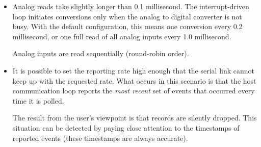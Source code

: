 \begin{itemize}
\item Analog reads take slightly longer than 0.1 millisecond. The 
interrupt-driven loop initiates conversions only when the analog to 
digital converter is not busy. With the default configuration, this means 
one conversion every 0.2 millisecond, or one full read of all analog 
inputs every 1.0 millisecond.

Analog inputs are read sequentially (round-robin order).

\item It is possible to set the reporting rate high enough that the serial 
link cannot keep up with the requested rate. What occurs in this scenario 
is that the host communication loop reports the \textit{most recent} set 
of events that occurred every time it is polled.

The result from the user's viewpoint is that records are silently dropped. 
This situation can be detected by paying close attention to the timestamps 
of reported events (these timestamps are always accurate).
\end{itemize}

%
